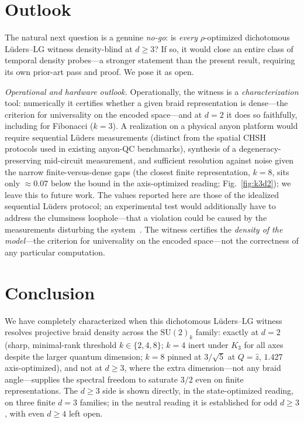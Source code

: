 \documentclass[aps,prx,reprint,amsmath,amssymb,floatfix,nofootinbib,superscriptaddress]{revtex4-2}
\begin{document}
\section{Outlook}
\label{sec:outlook}

The natural next question is a genuine \emph{no-go}: is \emph{every} $\rho$-optimized
dichotomous L\"uders--LG witness density-blind at $d \ge 3$? If so, it would close an
entire class of temporal density probes---a stronger statement than the present
result, requiring its own prior-art pass and proof. We pose it as open.

\emph{Operational and hardware outlook.} Operationally, the witness is a
\emph{characterization} tool: numerically it certifies whether a given braid
representation is dense---the criterion for universality on the encoded
space---and at $d=2$ it does so
faithfully, including for Fibonacci ($k=3$). A realization on a physical anyon
platform would require sequential L\"uders measurements (distinct from the spatial
CHSH protocols used in existing anyon-QC benchmarks), synthesis of a
degeneracy-preserving mid-circuit measurement, and sufficient resolution against noise
given the narrow finite-versus-dense gaps (the closest finite representation, $k=8$,
sits only $\approx 0.07$ below the bound in the axis-optimized reading;
Fig.~\ref{fig:k3d2}); we leave this to future work. The values reported here are those of the idealized sequential L\"uders protocol; an experimental test would additionally have to address the clumsiness loophole---that a violation could be caused by the measurements disturbing the system~\cite{WildeMizel2012,EmaryLambertNori2014}. The witness certifies the
\emph{density of the model}---the criterion for universality on the encoded
space---not the correctness of any particular computation.

\section{Conclusion}
\label{sec:conc}

We have completely characterized when this dichotomous L\"uders--LG witness resolves
projective braid density across the $\mathrm{SU}(2)_k$ family: exactly at $d=2$ (sharp,
minimal-rank threshold $k \in \{2,4,8\}$; $k=4$ inert under $K_3$ for all axes despite the larger quantum
dimension; $k=8$ pinned at $3/\sqrt5$ at $Q=\hat z$, $1.427$ axis-optimized), and not at $d \ge 3$, where the extra
dimension---not any braid angle---supplies the spectral freedom to saturate $3/2$ even
on finite representations. The $d\ge3$ side is shown directly, in the state-optimized reading, on three finite $d=3$ families; in the neutral reading it is established for odd $d\ge3$, with even $d\ge4$ left open.
\end{document}
